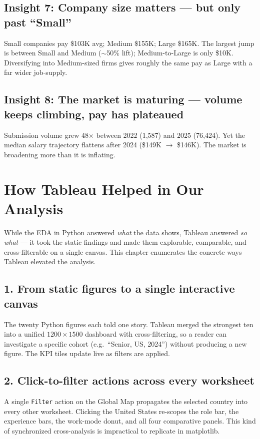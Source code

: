 \documentclass[11pt,a4paper,oneside]{report}
\begin{document}
\section{Insight 7: Company size matters --- but only past ``Small''}
\begin{insightbox}
Small companies pay \$103K avg; Medium \$155K; Large \$165K. The largest jump is between Small and Medium ($\sim$50\% lift); Medium-to-Large is only \$10K. Diversifying into Medium-sized firms gives roughly the same pay as Large with a far wider job-supply.
\end{insightbox}

\section{Insight 8: The market is maturing --- volume keeps climbing, pay has plateaued}
\begin{insightbox}
Submission volume grew 48$\times$ between 2022 (1,587) and 2025 (76,424). Yet the median salary trajectory flattens after 2024 (\$149K $\to$ \$146K). The market is broadening more than it is inflating.
\end{insightbox}

\chapter{How Tableau Helped in Our Analysis}
\label{ch:tableau_helped}

While the EDA in Python answered \textit{what} the data shows, Tableau answered \textit{so what} --- it took the static findings and made them explorable, comparable, and cross-filterable on a single canvas. This chapter enumerates the concrete ways Tableau elevated the analysis.

\section{1. From static figures to a single interactive canvas}
The twenty Python figures each told one story. Tableau merged the strongest ten into a unified $1200\times1500$ dashboard with cross-filtering, so a reader can investigate a specific cohort (e.g.\ ``Senior, US, 2024'') without producing a new figure. The KPI tiles update live as filters are applied.

\section{2. Click-to-filter actions across every worksheet}
A single \texttt{Filter} action on the Global Map propagates the selected country into every other worksheet. Clicking the United States re-scopes the role bar, the experience bars, the work-mode donut, and all four comparative panels. This kind of synchronized cross-analysis is impractical to replicate in matplotlib.
\end{document}

